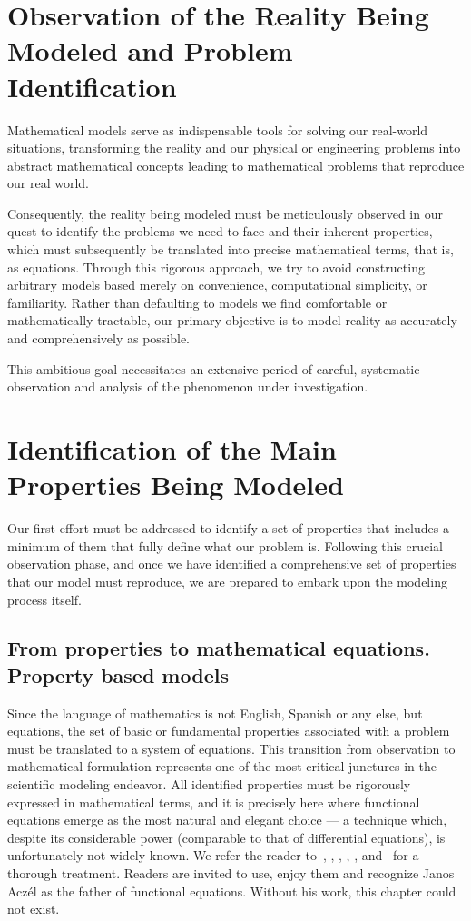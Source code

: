 \section{Observation of the Reality Being Modeled and Problem Identification}
Mathematical models serve as indispensable tools for solving our real-world situations, transforming the reality and our physical or engineering problems into abstract mathematical concepts leading to mathematical problems that reproduce our real world.

Consequently, the reality being modeled must be meticulously observed in our quest to identify the problems we need to face and their inherent properties, which must subsequently be translated into precise mathematical terms, that is, as equations. Through this rigorous approach, we try to avoid constructing arbitrary models based merely on convenience, computational simplicity, or familiarity. Rather than defaulting to models we find comfortable or mathematically tractable, our primary objective is to model reality as accurately and comprehensively as possible.

This ambitious goal necessitates an extensive period of careful, systematic observation and analysis of the phenomenon under investigation.

\section{Identification of the Main Properties Being Modeled}
Our first effort must be addressed to identify a set of properties that includes a minimum of them that fully define what our problem is.
Following this crucial observation phase, and once we have identified a comprehensive set of properties that our model must reproduce, we are prepared to embark upon the modeling process itself.

\subsection{From properties to mathematical equations. Property based models}
Since the language of mathematics is not English, Spanish or any else, but equations, the set of basic or fundamental properties associated with a problem must be translated to a system of equations.
This transition from observation to mathematical formulation represents one of the most critical junctures in the scientific modeling endeavor.
All identified properties must be rigorously expressed in mathematical terms, and it is precisely here where functional equations emerge as the most natural and elegant choice — a technique which, despite its considerable power (comparable to that of differential equations), is unfortunately not widely known. We refer the reader to~\cite{aczel1964functional}, \cite{aczel1989functional}, \cite{aczel2006lectures}, \cite{alsina2006associative}, \cite{castillo1992functional}, \cite{CastilloRuiz1993} and~\cite{castillo2004functional} for a thorough treatment. Readers are invited to use, enjoy them and recognize Janos Aczél as the father of functional equations. Without his work, this chapter could not exist.

